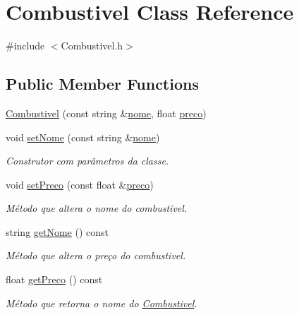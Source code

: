 \hypertarget{class_combustivel}{\section{Combustivel Class Reference}
\label{class_combustivel}
}


{\ttfamily \#include $<$Combustivel.\+h$>$}

\subsection*{Public Member Functions}
\begin{DoxyCompactItemize}
\item 
\hyperlink{class_combustivel_a101e8181fe6c4e21aa3c73cd3888467e}{Combustivel} (const string \&\hyperlink{class_combustivel_adfa329c4c4b60abcb87c1f3c82be4145}{nome}, float \hyperlink{class_combustivel_ac910a8410930ba553861f584da9f48d1}{preco})
\item 
void \hyperlink{class_combustivel_a0f1311345a421884cf290b413e1df9b4}{set\+Nome} (const string \&\hyperlink{class_combustivel_adfa329c4c4b60abcb87c1f3c82be4145}{nome})
\begin{DoxyCompactList}\small\item\em Construtor com parâmetros da classe. \end{DoxyCompactList}\item 
void \hyperlink{class_combustivel_ac0ddd40d9511ca92c5d44a9e4f503d95}{set\+Preco} (const float \&\hyperlink{class_combustivel_ac910a8410930ba553861f584da9f48d1}{preco})
\begin{DoxyCompactList}\small\item\em Método que altera o nome do combustivel. \end{DoxyCompactList}\item 
string \hyperlink{class_combustivel_a20ab48a38371dedfc40ca4b5e11dbb5e}{get\+Nome} () const 
\begin{DoxyCompactList}\small\item\em Método que altera o preço do combustivel. \end{DoxyCompactList}\item 
float \hyperlink{class_combustivel_a7e4bbd943b0534fc2c1fdf3ce6861f14}{get\+Preco} () const 
\begin{DoxyCompactList}\small\item\em Método que retorna o nome do \hyperlink{class_combustivel}{Combustivel}. \end{DoxyCompactList}\item 

\end{DoxyCompactItemize}
